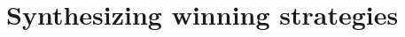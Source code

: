 \documentclass[review]{elsarticle}
\newcommand{\nmodels}{\mathrel{\ooalign{$\models$\cr\hfil$/$\hfil\cr}}}
\newcommand{\set}[1]{\{ #1 \}}
\newcommand{\tuple}[1]{\langle {#1} \rangle}
\newcommand{\true}{\top}
\newcommand{\false}{\bot}
\newcommand{\statevar}{\mathcal{X}}
\newcommand{\positiveSet}{\mathcal{P}}
\newcommand{\negativeSet}{\mathcal{N}}
\newcommand{\loseSet}{\mathcal{L}}
\newcommand{\act}{\mathcal{A}}
\newcommand{\constraint}{\mathcal{C}}
\newcommand{\estate}{\mathcal{E}}
\newcommand{\pre}{\mathtt{pre}}
\newcommand{\suc}{\tau}
\newcommand{\assign}{\leftarrow}
\begin{document}
	


\section{Synthesizing winning strategies}

%
%	
%	
%	
%		
%		
%			
%				
%
%			
%
%
%		
%			
%
%				
\end{document}
